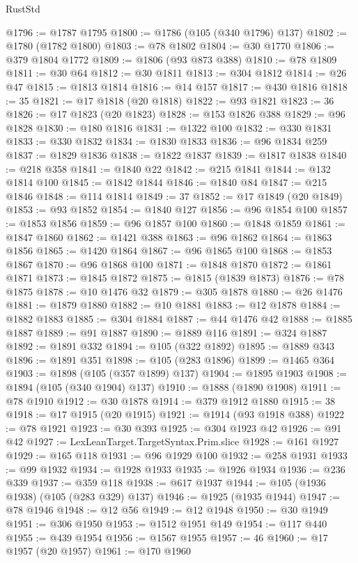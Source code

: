 \begin{lexlean}{RustStd}
\begin{coremodule}
@1796 := @1787 @1795
@1800 := @1786 (@105 (@340 @1796) @137)
@1802 := @1780 (@1782 @1800)
@1803 := @78 @1802
@1804 := @30 @1770
@1806 := @379 @1804 @1772
@1809 := @1806 (@93 @873 @388)
@1810 := @78 @1809
@1811 := @30 @64
@1812 := @30 @1811
@1813 := @304 @1812
@1814 := @26 @47
@1815 := @1813 @1814
@1816 := @14 @157
@1817 := @430 @1816
@1818 := 35
@1821 := @17 @1818 (@20 @1818)
@1822 := @93 @1821
@1823 := 36
@1826 := @17 @1823 (@20 @1823)
@1828 := @153 @1826 @388
@1829 := @96 @1828
@1830 := @180 @1816
@1831 := @1322 @100
@1832 := @330 @1831
@1833 := @330 @1832
@1834 := @1830 @1833
@1836 := @96 @1834 @259
@1837 := @1829 @1836
@1838 := @1822 @1837
@1839 := @1817 @1838
@1840 := @218 @358
@1841 := @1840 @22
@1842 := @215 @1841
@1844 := @132 @1814 @100
@1845 := @1842 @1844
@1846 := @1840 @84
@1847 := @215 @1846
@1848 := @114 @1814
@1849 := 37
@1852 := @17 @1849 (@20 @1849)
@1853 := @93 @1852
@1854 := @1840 @127
@1856 := @96 @1854 @100
@1857 := @1853 @1856
@1859 := @96 @1857 @100
@1860 := @1848 @1859
@1861 := @1847 @1860
@1862 := @1421 @388
@1863 := @96 @1862
@1864 := @1863 @1856
@1865 := @1420 @1864
@1867 := @96 @1865 @100
@1868 := @1853 @1867
@1870 := @96 @1868 @100
@1871 := @1848 @1870
@1872 := @1861 @1871
@1873 := @1845 @1872
@1875 := @1815 (@1839 @1873)
@1876 := @78 @1875
@1878 := @10 @1476 @32
@1879 := @305 @1878
@1880 := @26 @1476
@1881 := @1879 @1880
@1882 := @10 @1881
@1883 := @12 @1878
@1884 := @1882 @1883
@1885 := @304 @1884
@1887 := @44 @1476 @42
@1888 := @1885 @1887
@1889 := @91 @1887
@1890 := @1889 @116
@1891 := @324 @1887
@1892 := @1891 @332
@1894 := @105 (@322 @1892)
@1895 := @1889 @343
@1896 := @1891 @351
@1898 := @105 (@283 @1896)
@1899 := @1465 @364
@1903 := @1898 (@105 (@357 @1899) @137)
@1904 := @1895 @1903
@1908 := @1894 (@105 (@340 @1904) @137)
@1910 := @1888 (@1890 @1908)
@1911 := @78 @1910
@1912 := @30 @1878
@1914 := @379 @1912 @1880
@1915 := 38
@1918 := @17 @1915 (@20 @1915)
@1921 := @1914 (@93 @1918 @388)
@1922 := @78 @1921
@1923 := @30 @393
@1925 := @304 @1923 @42
@1926 := @91 @42
@1927 := LexLeanTarget.TargetSyntax.Prim.slice
@1928 := @161 @1927
@1929 := @165 @118
@1931 := @96 @1929 @100
@1932 := @258 @1931
@1933 := @99 @1932
@1934 := @1928 @1933
@1935 := @1926 @1934
@1936 := @236 @339
@1937 := @359 @118
@1938 := @617 @1937
@1944 := @105 (@1936 @1938) (@105 (@283 @329) @137)
@1946 := @1925 (@1935 @1944)
@1947 := @78 @1946
@1948 := @12 @56
@1949 := @12 @1948
@1950 := @30 @1949
@1951 := @306 @1950
@1953 := @1512 @1951 @149
@1954 := @117 @440
@1955 := @439 @1954
@1956 := @1567 @1955
@1957 := 46
@1960 := @17 @1957 (@20 @1957)
@1961 := @170 @1960

\end{coremodule}
\end{lexlean}
